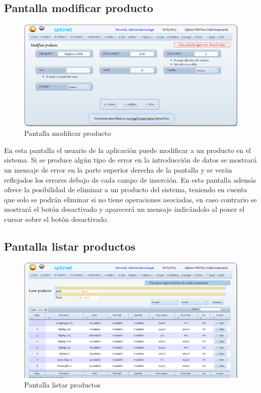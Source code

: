 \documentclass[a4paper,11pt]{book}
\begin{document}
\subsection {Pantalla modificar producto}

\begin{figure}[!htb]
  \centering
    \includegraphics[scale=0.35]{capmodificarproducto.png}
  \caption{Pantalla modificar producto}
  \label{a}
\end{figure}

En esta pantalla el usuario de la aplicación puede modificar a un producto en el sistema. Si se produce algún tipo de error en la introducción de datos se mostrará un mensaje de error en la parte superior derecha de la pantalla y se verán reflejados los errores debajo de cada campo de inserción. En esta pantalla además ofrece la posibilidad de eliminar a un producto del sistema, teniendo en cuenta que solo se podrán eliminar si no tiene operaciones asociadas, en caso contrario se mostrará el botón desactivado y aparecerá un mensaje indicándolo al poner el cursor sobre el botón desactivado.
\newpage
\subsection {Pantalla listar productos}

\begin{figure}[!htb]
  \centering
    \includegraphics[scale=0.35]{caplistarproductos.png}
  \caption{Pantalla listar productos}
  \label{a}
\end{figure}
\end{document}
